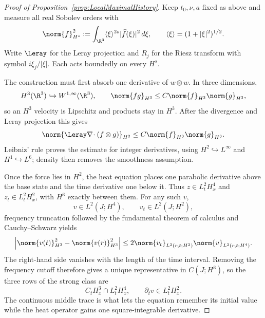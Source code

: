 \begin{proof}[Proof of Proposition~\ref{prop:LocalMaximalHistory}]
Keep \(t_0,\nu,a\) fixed as above and measure all real Sobolev orders with
\[
  \norm{f}_{H^s}^2
  :=\int_{\R^3}\langle\xi\rangle^{2s}
       |\widehat f(\xi)|^2\,d\xi,
  \qquad
  \langle\xi\rangle=(1+|\xi|^2)^{1/2}.
\]
Write \(\Leray\) for the Leray projection and \(R_j\) for the Riesz transform
with symbol \(i\xi_j/|\xi|\).  Each acts boundedly on every \(H^s\).


The construction must first absorb one derivative of \(w\otimes w\).  In three
dimensions,
\[
  H^3(\R^3)\hookrightarrow W^{1,\infty}(\R^3),
  \qquad
  \norm{fg}_{H^3}\leq C\norm{f}_{H^3}\norm{g}_{H^3},
\]
so an \(H^3\) velocity is Lipschitz and products stay in \(H^3\).  After the
divergence and Leray projection this gives
\begin{equation}
  \norm{\Leray\nabla\!\cdot(f\otimes g)}_{H^2}
  \leq C\norm{f}_{H^3}\norm{g}_{H^3}.
  \label{eq:LocalProductEstimate}
\end{equation}
Leibniz’ rule proves the estimate for integer derivatives, using
\(H^2\hookrightarrow L^\infty\) and \(H^1\hookrightarrow L^6\); density then
removes the smoothness assumption.

Once the force lies in \(H^2\), the heat equation places one parabolic derivative
above the base state and the time derivative one below it.  Thus
\(z\in L^2_tH^4_x\) and \(z_t\in L^2_tH^2_x\), with \(H^3\) exactly between
them.  For any such \(v\),
\[
  v\in L^2(J;H^4),
  \qquad
  v_t\in L^2(J;H^2),
\]
frequency truncation followed by the fundamental theorem of calculus and
Cauchy--Schwarz yields
\begin{equation}
  \left|
    \norm{v(t)}_{H^3}^2-\norm{v(r)}_{H^3}^2
  \right|
  \leq
  2\norm{v_t}_{L^2(r,t;H^2)}
   \norm{v}_{L^2(r,t;H^4)}.
  \label{eq:LocalAdjacentTrace}
\end{equation}
The right-hand side vanishes with the length of the time interval.  Removing the
frequency cutoff therefore gives a unique representative in \(C(J;H^3)\), so
the three rows of the strong class are
\[
  C_tH^3_x\cap L^2_tH^4_x,
  \qquad
  \partial_t v\in L^2_tH^2_x.
\]
The continuous middle trace is what lets the equation remember its initial
value while the heat operator gains one square-integrable derivative.



\end{proof}
